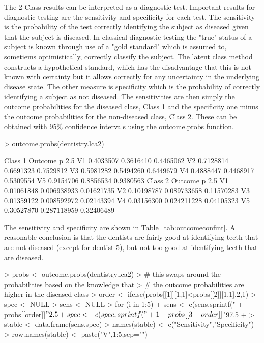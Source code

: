 The 2 Class results can be interpreted as a diagnostic test. Important results for diagnostic testing are the sensitivity and specificity for each test. The sensitivity is the probability of the test correctly identifying the subject as diseased given that the subject is diseased. In classical diagnostic testing the "true" status of a subject is known through use of a "gold standard" which is assumed to, sometiems optimistically, correctly classify the subject. The latent class method constructs a hypothetical standard, which has the disadvantage that this is not known with certainty but it allows correctly for any uncertainty in the underlying disease state. The other measure is specificity which is the probability of correctly identifying a subject as not diseased.
The sensitivities are then simply the outcome probabilities for the diseased class, Class 1 and the specificity one minus the outcome probabilities for the non-diseased class, Class 2. These can be obtained with 95\% confidence intervals using the outcome.probs function.

\begin{Schunk}
\begin{Sinput}
> outcome.probs(dentistry.lca2)
\end{Sinput}
\begin{Soutput}
Class  1 
   Outcome p     2.5 %
V1 0.4033507 0.3616410 0.4465062
V2 0.7128814 0.6691323 0.7529812
V3 0.5981282 0.5494260 0.6449679
V4 0.4888447 0.4468917 0.5309554
V5 0.9154706 0.8856534 0.9380563
Class  2 
    Outcome p       2.5 %
V1 0.01061848 0.006938933 0.01621735
V2 0.10198787 0.089733658 0.11570283
V3 0.01359122 0.008592972 0.02143394
V4 0.03156300 0.024211228 0.04105323
V5 0.30527870 0.287118959 0.32406489
\end{Soutput}
\end{Schunk}

The sensitivity and specificity are shown in Table~\ref{tab:outcomeconfint}. A reasonable conclusion is that the dentists are fairly good at identifying teeth that are not diseased (except for dentist 5), but not too good at identifying teeth that are diseased.

\begin{Schunk}
\begin{Sinput}
> probs <- outcome.probs(dentistry.lca2)
> # this swaps around the probabilities based on the knowledge that
> # the outcome probabilities are higher in the diseased class
> order <- ifelse(probs[[1]][1,1]<probs[[2]][1,1],2,1)
> spec <- NULL
> sens <- NULL
> for (i in 1:5) {
+     sens <- c(sens,sprintf("%
+         probs[[order]]$"2.5 %
+     spec <- c(spec,sprintf("%
+         1-probs[[3-order]]$"97.5 %
+ }
> stable <- data.frame(sens,spec)
> names(stable) <- c("Sensitivity","Specificity")
> row.names(stable) <- paste("V",1:5,sep="")
\end{Sinput}
\end{Schunk}


